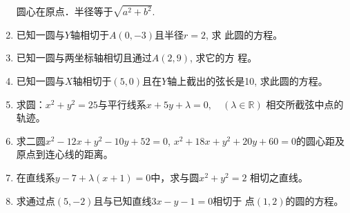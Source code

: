 \begin{enumerate}
圆心在原点．半径等于$\sqrt{a^2+b^2}$.
\item 已知一圆与$Y$轴相切于$A(0,-3)$且半径$r=2$, 求
此圆的方程。
\item 已知一圆与两坐标轴相切且通过$A(2,9)$, 求它的方
程。
\item 已知一圆与$X$轴相切于$(5,0)$且在$Y$轴上截出的弦长是10, 求此圆的方程。
\item 求圆：$x^2+y^2=25$与平行线系$x+5y+\lambda=0,\quad (\lambda\in\mathbb{R})$
相交所截弦中点的轨迹。
\item 求二圆$x^2-12x+y^2-10y+52=0$, $x^2+18x+y^2+
20y+60=0$的圆心距及原点到连心线的距离。
\item 在直线系$y-7+\lambda(x+1)=0$中，求与圆$x^2+y^2=2$
相切之直线。
\item 求通过点$(5,-2)$且与已知直线$3x-y-1=0$相切于
点$(1,2)$的圆的方程。
\end{enumerate}


